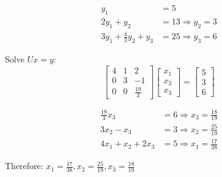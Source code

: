\begin{align*}
	y_1 &= 5 \\
	2y_1 + y_2 &= 13 \Rightarrow y_2 = 3 \\
	3y_1 + \frac{4}{3}y_2 + y_3 &= 25 \Rightarrow y_3 = 6
\end{align*}

Solve $Ux = y$:
\[
	\begin{bmatrix}
		4 & 1 & 2 \\
		0 & 3 & -1 \\
		0 & 0 & \frac{19}{3}
	\end{bmatrix} \begin{bmatrix}
		x_1 \\ x_2 \\ x_3
	\end{bmatrix} = \begin{bmatrix}
		5 \\ 3 \\ 6
	\end{bmatrix}
\]

\begin{align*}
	\frac{19}{3}x_3 &= 6 \Rightarrow x_3 = \frac{18}{19} \\
	3x_2 - x_3 &= 3 \Rightarrow x_2 = \frac{25}{19} \\
	4x_1 + x_2 + 2x_3 &= 5 \Rightarrow x_1 = \frac{17}{38}
\end{align*}

Therefore: $x_1 = \frac{17}{38}, x_2 = \frac{25}{19}, x_3 = \frac{18}{19}$
